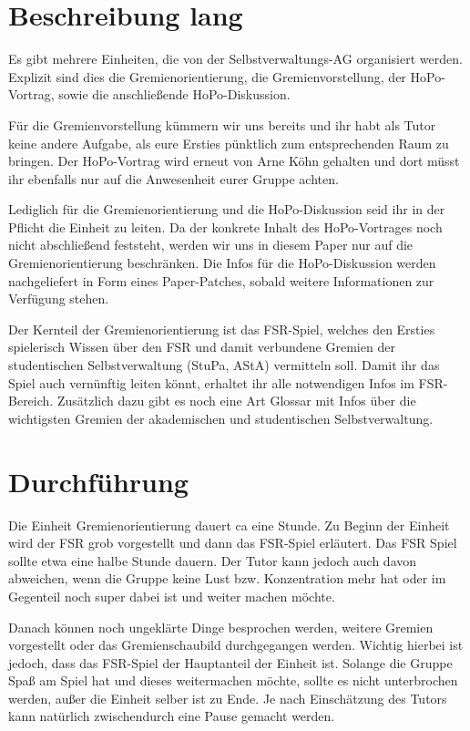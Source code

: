 \documentclass[a4paper,11pt]{scrartcl} %
\begin{document}
\section{Beschreibung lang}

Es gibt mehrere Einheiten, die von der Selbstverwaltungs-AG
organisiert werden. Explizit sind dies die Gremienorientierung,
die Gremienvorstellung, der HoPo-Vortrag, sowie die anschließende
HoPo-Diskussion.

Für die Gremienvorstellung kümmern wir uns bereits und ihr habt
als Tutor keine andere Aufgabe, als eure Ersties pünktlich zum
entsprechenden Raum zu bringen. Der HoPo-Vortrag wird erneut von
Arne Köhn gehalten und dort müsst ihr ebenfalls nur auf die Anwesenheit
eurer Gruppe achten.

Lediglich für die Gremienorientierung und die HoPo-Diskussion seid
ihr in der Pflicht die Einheit zu leiten. Da der konkrete Inhalt des
HoPo-Vortrages noch nicht abschließend feststeht, werden wir uns in diesem
Paper nur auf die Gremienorientierung beschränken. Die Infos für die
HoPo-Diskussion werden nachgeliefert in Form eines Paper-Patches, sobald
weitere Informationen zur Verfügung stehen.

Der Kernteil der Gremienorientierung ist das FSR-Spiel, welches den
Ersties spielerisch Wissen über den FSR und damit verbundene Gremien
der studentischen Selbstverwaltung (StuPa, AStA) vermitteln soll. Damit
ihr das Spiel auch vernünftig leiten könnt, erhaltet ihr alle notwendigen
Infos im FSR-Bereich. Zusätzlich dazu gibt es noch eine Art Glossar mit Infos
über die wichtigsten Gremien der akademischen und studentischen Selbstverwaltung.
    
\section{Durchführung}

Die Einheit Gremienorientierung dauert ca eine Stunde. Zu Beginn 
der Einheit wird der FSR grob vorgestellt und dann das FSR-Spiel 
erläutert. Das FSR Spiel sollte etwa eine halbe Stunde dauern. Der 
Tutor kann jedoch auch davon abweichen, wenn die Gruppe keine Lust 
bzw. Konzentration mehr hat oder im Gegenteil noch super dabei ist und 
weiter machen möchte.

Danach können noch ungeklärte Dinge besprochen werden,
weitere Gremien vorgestellt oder das Gremienschaubild
durchgegangen werden. Wichtig hierbei ist jedoch, dass das FSR-Spiel
der Hauptanteil der Einheit ist. Solange die Gruppe Spaß am Spiel
hat und dieses weitermachen möchte, sollte es nicht unterbrochen werden,
außer die Einheit selber ist zu Ende. Je nach Einschätzung des Tutors 
kann natürlich zwischendurch eine Pause gemacht werden.
\end{document}
